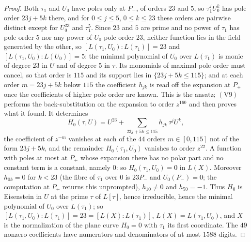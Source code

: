 \documentclass[11pt]{amsart}
\theoremstyle{plain}
\theoremstyle{definition}
\begin{document}
\begin{proof}
Both $\tau_1$ and $U_0$ have poles only at $P_+$, of orders $23$ and
$5$, so $\tau_1^jU_0^k$ has pole order $23j+5k$ there, and for
$0\le j\le5$, $0\le k\le23$ these orders are pairwise distinct except
for $U_0^{23}$ and $\tau_1^5$. Since $23$ and $5$ are prime and no
power of $\tau_1$ has pole order $5$ nor any power of $U_0$ pole order
$23$, neither function lies in the field generated by the other, so
$[L(\tau_1,U_0):L(\tau_1)]=23$ and $[L(\tau_1,U_0):L(U_0)]=5$: the
minimal polynomial of $U_0$ over $L(\tau_1)$ is monic of degree $23$
in $U$ and of degree $5$ in $\tau$. Its monomials of maximal pole order
must cancel, so that order is $115$ and its support lies in
$\{23j+5k\le115\}$; and at each order $m=23j+5k$ below $115$ the
coefficient $h_{jk}$ is read off the expansion at $P_+$ once the
coefficients of higher pole order are known. This is the ansatz;
$(\mathrm V9)$ performs the back-substitution on the expansion to
order $z^{160}$ and then proves what it found. It determines
\[
  H_0(\tau,U)=U^{23}+\sum_{23j+5k\le115}h_{jk}\,\tau^jU^k ,
\]
the coefficient of $z^{-m}$ vanishes at each of the $44$ orders
$m\in[0,115]$ not of the form $23j+5k$, and the remainder
$H_0(\tau_1,U_0)$ vanishes to order $z^{22}$. A function with poles at
most at $P_+$ whose expansion there has no polar part and no constant
term is a constant, namely $0$: so $H_0(\tau_1,U_0)=0$ in $L(X)$.
Moreover $h_{0k}=0$ for $k<23$ (the fibre of $\tau_1$ over $0$ is
$23P_-$ and $U_0(P_-)=0$; the computation at $P_+$ returns this
unprompted), $h_{10}\ne0$ and $h_{50}=-1$. Thus $H_0$ is Eisenstein in
$U$ at the prime $\tau$ of $L[\tau]$, hence irreducible, hence the
minimal polynomial of $U_0$ over $L(\tau_1)$; so
$[L(\tau_1,U_0):L(\tau_1)]=23=[L(X):L(\tau_1)]$, $L(X)=L(\tau_1,U_0)$,
and $X$ is the normalization of the plane curve $H_0=0$ with $\tau_1$
its first coordinate. The $49$ nonzero coefficients have numerators and
denominators of at most $1588$ digits.


\end{proof}
\end{document}
